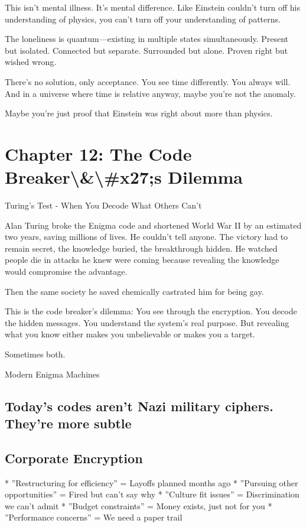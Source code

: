 \documentclass[12pt,oneside]{book}
\begin{document}
This isn't mental illness. It's mental difference. Like Einstein couldn't turn off his understanding of physics, you can't turn off your understanding of patterns.

The loneliness is quantum---existing in multiple states simultaneously. Present but isolated. Connected but separate. Surrounded but alone. Proven right but wished wrong.

There's no solution, only acceptance. You see time differently. You always will. And in a universe where time is relative anyway, maybe you're not the anomaly.

Maybe you're just proof that Einstein was right about more than physics.

\chapter{Chapter 12: The Code Breaker\textbackslash{}&\textbackslash{}#x27;s Dilemma}

Turing's Test - When You Decode What Others Can't

Alan Turing broke the Enigma code and shortened World War II by an estimated two years, saving millions of lives. He couldn't tell anyone. The victory had to remain secret, the knowledge buried, the breakthrough hidden. He watched people die in attacks he knew were coming because revealing the knowledge would compromise the advantage.

Then the same society he saved chemically castrated him for being gay.

This is the code breaker's dilemma: You see through the encryption. You decode the hidden messages. You understand the system's real purpose. But revealing what you know either makes you unbelievable or makes you a target.

Sometimes both.

Modern Enigma Machines

\section{Today's codes aren't Nazi military ciphers. They're more subtle}

\section{Corporate Encryption}

                    * ''Restructuring for efficiency'' = Layoffs planned months ago
                    * ''Pursuing other opportunities'' = Fired but can't say why
                    * ''Culture fit issues'' = Discrimination we can't admit
                    * ''Budget constraints'' = Money exists, just not for you
                    * ''Performance concerns'' = We need a paper trail
\end{document}
